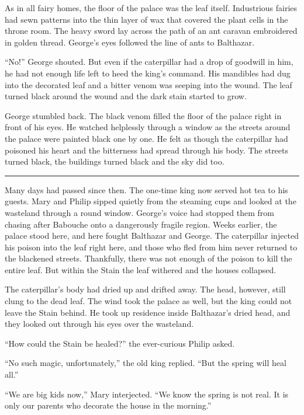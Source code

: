 \documentclass[10pt]{memoir}
\renewcommand{\pfbreakdisplay}{\bigskip \ding{166} \bigskip}
\newcommand{\secbreak}{\fancybreak{\pfbreakdisplay}}
\begin{document}
As in all fairy homes, the floor of the palace was the leaf itself. Industrious
fairies had sewn patterns into the thin layer of wax that covered the plant
cells in the throne room. The heavy sword lay across the path of an ant caravan
embroidered in golden thread. George's eyes followed the line of ants to
Balthazar.

``No!'' George shouted. But even if the caterpillar had a drop of goodwill in
him, he had not enough life left to heed the king's command. His mandibles had
dug into the decorated leaf and a bitter venom was seeping into the wound. The
leaf turned black around the wound and the dark stain started to grow.

George stumbled back. The black venom filled the floor of the palace right in
front of his eyes. He watched helplessly through a window as the streets around
the palace were painted black one by one. He felt as though the caterpillar had
poisoned his heart and the bitterness had spread through his body. The streets
turned black, the buildings turned black and the sky did too.

\secbreak

Many days had passed since then. The one-time king now served hot tea to his
guests. Mary and Philip sipped quietly from the steaming cups and looked at the
wasteland through a round window. George's voice had stopped them from chasing
after Babouche onto a dangerously fragile region. Weeks earlier, the palace
stood here, and here fought Balthazar and George. The caterpillar injected his
poison into the leaf right here, and those who fled from him never returned to
the blackened streets. Thankfully, there was not enough of the poison to kill
the entire leaf. But within the Stain the leaf withered and the houses
collapsed.

The caterpillar's body had dried up and drifted away. The head, however, still
clung to the dead leaf. The wind took the palace as well, but the king could
not leave the Stain behind. He took up residence inside Balthazar's dried head,
and they looked out through his eyes over the wasteland.

``How could the Stain be healed?'' the ever-curious Philip asked.

``No such magic, unfortunately,'' the old king replied. ``But the spring will
heal all.''

``We are big kids now,'' Mary interjected. ``We know the spring is not real. It
is only our parents who decorate the house in the morning.''
\end{document}
